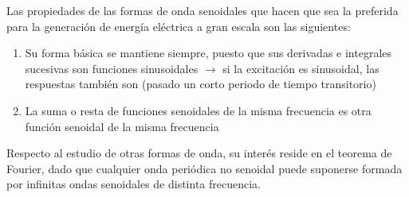 \documentclass[11pt]{book} %
\numberwithin{dummy}{section}
\theoremstyle{ocrenumbox}
\theoremstyle{blacknumex}
\theoremstyle{blacknumbox}
\theoremstyle{ocrenum}
\newlength\esp
\begin{document}
	Las propiedades de las formas de onda senoidales que hacen que sea la preferida para la generación de energía eléctrica a gran escala son las siguientes:
	\begin{enumerate}
		\item Su forma básica se mantiene siempre, puesto que sus derivadas e integrales sucesivas son funciones sinusoidales $\rightarrow$ si la excitación es sinusoidal, las respuestas también son (pasado un corto periodo de tiempo transitorio)
		\item La suma o resta de funciones senoidales de la misma frecuencia es otra función senoidal de la misma frecuencia
	\end{enumerate}
	Respecto al estudio de otras formas de onda, su interés reside en el teorema de Fourier, dado que cualquier onda periódica no senoidal puede suponerse formada por
	infinitas ondas senoidales de distinta frecuencia. 
	
\end{document}
